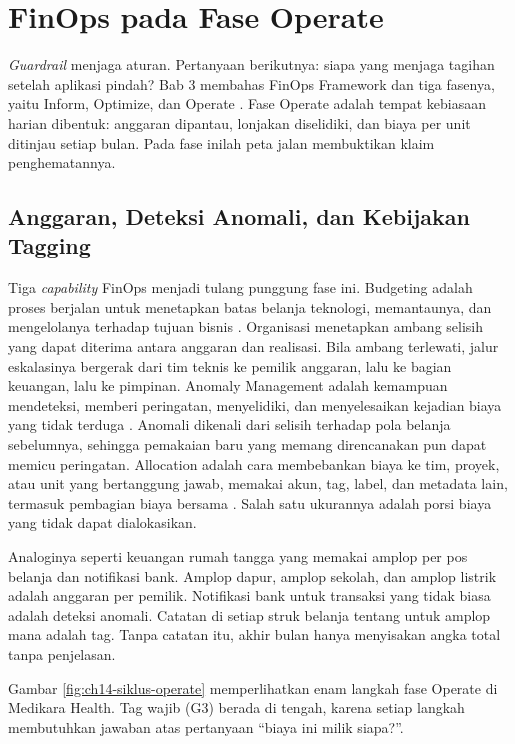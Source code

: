 \section{FinOps pada Fase Operate}
\label{sec:ch14-finops}

\textit{Guardrail} menjaga aturan. Pertanyaan berikutnya: siapa yang menjaga tagihan setelah
aplikasi pindah? Bab 3 membahas FinOps Framework dan tiga fasenya, yaitu Inform, Optimize, dan
Operate \cite{finops2026}. Fase Operate adalah tempat kebiasaan harian dibentuk: anggaran dipantau,
lonjakan diselidiki, dan biaya per unit ditinjau setiap bulan. Pada fase inilah peta jalan
membuktikan klaim penghematannya.

\subsection{Anggaran, Deteksi Anomali, dan Kebijakan Tagging}

Tiga \textit{capability} FinOps menjadi tulang punggung fase ini. Budgeting adalah proses berjalan
untuk menetapkan batas belanja teknologi, memantaunya, dan mengelolanya terhadap tujuan bisnis
\cite{c14-finops-budgeting}. Organisasi menetapkan ambang selisih yang dapat diterima antara anggaran
dan realisasi. Bila ambang terlewati, jalur eskalasinya bergerak dari tim teknis ke pemilik
anggaran, lalu ke bagian keuangan, lalu ke pimpinan. Anomaly Management adalah kemampuan mendeteksi,
memberi peringatan, menyelidiki, dan menyelesaikan kejadian biaya yang tidak terduga
\cite{c14-finops-anomaly}. Anomali dikenali dari selisih terhadap pola belanja sebelumnya, sehingga
pemakaian baru yang memang direncanakan pun dapat memicu peringatan. Allocation adalah cara
membebankan biaya ke tim, proyek, atau unit yang bertanggung jawab, memakai akun, tag, label, dan
metadata lain, termasuk pembagian biaya bersama \cite{c14-finops-allocation}. Salah satu ukurannya
adalah porsi biaya yang tidak dapat dialokasikan.

Analoginya seperti keuangan rumah tangga yang memakai amplop per pos belanja dan notifikasi bank.
Amplop dapur, amplop sekolah, dan amplop listrik adalah anggaran per pemilik. Notifikasi bank untuk
transaksi yang tidak biasa adalah deteksi anomali. Catatan di setiap struk belanja tentang untuk
amplop mana adalah tag. Tanpa catatan itu, akhir bulan hanya menyisakan angka total tanpa penjelasan.

Gambar \ref{fig:ch14-siklus-operate} memperlihatkan enam langkah fase Operate di Medikara Health.
Tag wajib (G3) berada di tengah, karena setiap langkah membutuhkan jawaban atas pertanyaan ``biaya
ini milik siapa?''.

